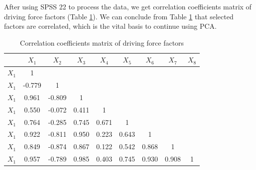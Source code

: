 After using SPSS 22 to process the data, we get correlation coefficients matrix of driving force factors (Table \ref{correlation}). We can conclude from Table \ref{correlation} that selected factors are correlated, which is the vital basis to continue using PCA.
\begin{table}[h]
\centering\caption{Correlation coefficients matrix of driving force factors}
\begin{tabular}{c|cccccccc}
  \hline
   & $X_1$ & $X_2$ & $X_3$ & $X_4$ & $X_5$ & $X_6$ & $X_7$ & $X_8$ \\
  \hline
  $X_1$ & 1 &  &  &  &  &  &  &  \\
  $X_1$ & -0.779 & 1 &  &  &  &  &  &  \\
  $X_1$ & 0.961 & -0.809 & 1 &  &  &  &  &  \\
  $X_1$ & 0.550 & -0.072 & 0.411 & 1 &  &  &  &  \\
  $X_1$ & 0.764 & -0.285 & 0.745 & 0.671 & 1 &  &  &  \\
  $X_1$ & 0.922 & -0.811 & 0.950 & 0.223 & 0.643 & 1 &  &  \\
  $X_1$ & 0.849 & -0.874 & 0.867 & 0.122 & 0.542 & 0.868 & 1 &  \\
  $X_1$ & 0.957 & -0.789 & 0.985 & 0.403 & 0.745 & 0.930 & 0.908 & 1 \\
  \hline
\end{tabular}\label{correlation}
\end{table}

